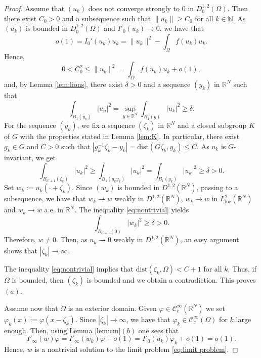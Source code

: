 \documentclass[10pt,a4paper]{amsart}
\def\cC{\mathcal{C}}
\def\dist{\mathrm{dist}}
\def\io{\int_{\Omega}}
\def\n{\mathbb{N}}
\def\o{\Omega}
\def\rh{\rightharpoonup}
\def\rn{\mathbb{R}^N}
\def\vp{\varphi}
\begin{document}
\begin{proof}
Assume that $(u_k)$ does not converge strongly to $0$ in $D^{1,2}_0(\o)$. Then there exist $C_0>0$ and a subsequence such that $\|u_k\|\geq C_0$ for all $k\in\n$. As $(u_k)$ is bounded in $D^{1,2}_0(\o)$ and $I'_0(u_k)\to 0$, we have that
$$o(1)=I_0'(u_k)u_k= \|u_k\|^2 - \io f(u_k)u_k.$$
Hence,
$$0<C_0^2\leq\|u_k\|^2=\io f(u_k)u_k+o(1),$$
and, by Lemma \ref{lem:lions}, there exist $\delta >0$ and a sequence $(y_k)$ in $\rn$ such that
$$\int_{B_1(y_k)} |u_n|^2 = \sup_{y\in\rn} \int_{B_1(y)} |u_k|^2 \geq\delta.$$
For the sequence $(y_k)$, we fix a sequence $(\zeta_k)$ in $\rn$ and a closed subgroup $K$ of $G$ with the properties stated in Lemma \ref{lem:K}. In particular, there exist $g_k\in G$ and $C>0$ such that $|g_k^{-1}\zeta_k-y_k|=\mathrm{dist}(G\zeta_k,y_k)\leq C$. As $u_k$ is $G$-invariant, we get
\begin{equation}\label{eq:nontrivial}
\int_{B_{C+1}(\zeta_k)} |u_k|^{2} \geq \int_{B_1(g_k y_k)} |u_k|^{2} = \int_{B_1(y_k)} |u_k|^{2}\geq\delta>0.
\end{equation}
Set $w_k := u_k(\cdot + \zeta_k)$. Since $(w_k)$ is bounded in $D^{1,2}(\rn)$, passing to a subsequence, we have that
$w_k\rh w$ weakly in $D^{1,2}(\rn)$, $w_k\to w$ in $L^{2}_{\mathrm{loc}}(\rn)$ and $w_k\to w$ a.e. in $\rn$.
The inequality \eqref{eq:nontrivial} yields
$$\int_{B_{C+1}(0)} |w_k|^{2} \geq \delta>0.$$
Therefore, $w\neq 0$. Then, as $u_k \rh 0$ weakly in $D^{1,2}(\rn)$, an easy argument shows that $|\zeta_k|\to\infty$.

The inequality \eqref{eq:nontrivial} implies that $\dist(\zeta_k,\o)<C+1$ for all $k$. Thus, if $\o$ is bounded, then $(\zeta_k)$ is bounded and we obtain a contradiction. This proves $(a)$.

Assume now that $\o$ is an exterior domain. Given $\vp\in\cC^\infty_c(\rn)$ we set $\vp_k(x):=\vp(x-\zeta_k)$. Since $|\zeta_k|\to\infty$, we have that $\vp_k\in \cC^\infty_c(\o)$ for $k$ large enough. Then, using Lemma \ref{lem:cm}$(b)$ one sees that
$$I'_\infty(w)\vp=I'_\infty(w_k)\vp+o(1)=I'_0(u_k)\vp_k+o(1)=o(1).$$
Hence, $w$ is a nontrivial solution to the limit problem \eqref{eq:limit problem}.


\end{proof}
\end{document}
